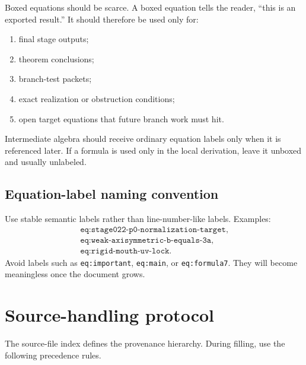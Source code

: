 Boxed equations should be scarce.  A boxed equation tells the reader, ``this is an exported result.''  It should therefore be used only for:

\begin{enumerate}[leftmargin=2.0em]
\item final stage outputs;
\item theorem conclusions;
\item branch-test packets;
\item exact realization or obstruction conditions;
\item open target equations that future branch work must hit.
\end{enumerate}

Intermediate algebra should receive ordinary equation labels only when it is referenced later.  If a formula is used only in the local derivation, leave it unboxed and usually unlabeled.

\subsection{Equation-label naming convention}
\label{subsec:equation-label-naming-convention}

Use stable semantic labels rather than line-number-like labels.  Examples:
\[
\begin{aligned}
\texttt{eq:stage022-p0-normalization-target},\\
\texttt{eq:weak-axisymmetric-b-equals-3a},\\
\texttt{eq:rigid-mouth-uv-lock}.
\end{aligned}
\]
Avoid labels such as \texttt{eq:important}, \texttt{eq:main}, or \texttt{eq:formula7}.  They will become meaningless once the document grows.

\section{Source-handling protocol}
\label{sec:source-handling-protocol}

The source-file index defines the provenance hierarchy.  During filling, use the following precedence rules.

